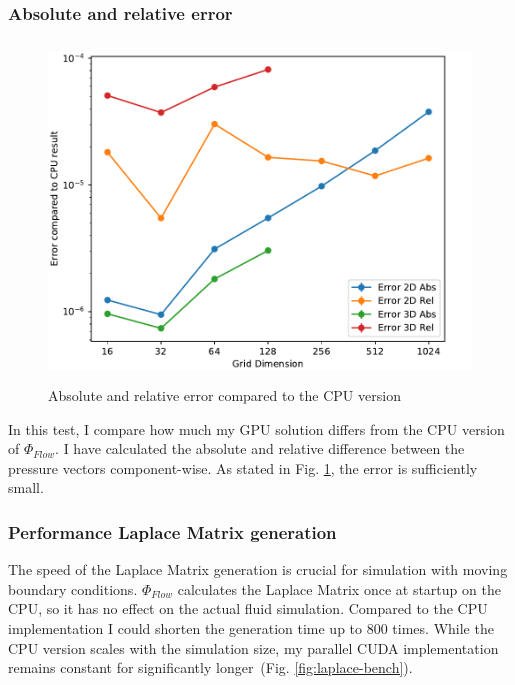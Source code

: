 \subsubsection{Absolute and relative error}
\begin{figure}[t]
\centering
	\includegraphics[height=9cm, width=14cm]{figures/error}
\caption{Absolute and relative error compared to the CPU version} \label{fig:error}
\end{figure}
In this test, I compare how much my GPU solution differs from the CPU version of $\Phi_{Flow}$. I have calculated the absolute and relative difference between the pressure vectors component-wise. As stated in Fig. \ref{fig:error}, the error is sufficiently small.

\clearpage
\subsubsection{Performance Laplace Matrix generation}
The speed of the Laplace Matrix generation is crucial for simulation with moving boundary conditions. $\Phi_{Flow}$ calculates the Laplace Matrix once at startup on the CPU, so it has no effect on the actual fluid simulation. Compared to the CPU implementation I could shorten the generation time up to 800 times.  While the CPU version scales with the simulation size, my parallel CUDA implementation remains constant for significantly longer (Fig. \ref{fig:laplace-bench}).

